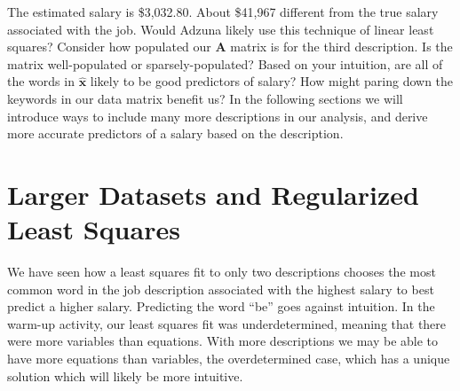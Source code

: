 \documentclass[12pt]{article}
\begin{document}
    The estimated salary is \$3,032.80. About \$41,967 different from the true
    salary associated with the job. Would Adzuna likely use this technique of
    linear least squares? Consider how populated our $\bm{A}$ matrix is for the
    third description. Is the matrix well-populated or sparsely-populated?
    Based on your intuition, are all of the words in $\bm{\hat{x}}$ likely to
    be good predictors of salary? How might paring down the keywords in our
    data matrix benefit us? In the following sections we will introduce ways to
    include many more descriptions in our analysis, and derive more accurate
    predictors of a salary based on the description.

\section{Larger Datasets and Regularized Least Squares}

    We have seen how a least squares fit to only two descriptions chooses the
    most common word in the job description associated with the highest salary
    to best predict a higher salary. Predicting the word ``be'' goes against
    intuition. In the warm-up activity, our least squares fit was
    underdetermined, meaning that there were more variables than equations.
    With more descriptions we may be able to have more equations than
    variables, the overdetermined case, which has a unique solution which will
    likely be more intuitive.

    \begin{center} 
        
        
    \end{center}
\end{document}
